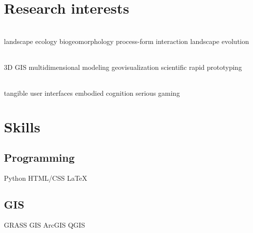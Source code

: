 \documentclass[]{baharmon-cv}
\begin{document}
{{{{{\section{Research interests}

\vspace*{0.2cm}
 \\ \vspace*{0.1cm}
\normalsize{
landscape ecology \textbullet{} biogeomorphology \textbullet{} process-form interaction \textbullet{} landscape evolution}
\\
\vspace*{0.2cm}

 \vspace{0.1em} \\ \vspace*{0.1cm}
\normalsize{
3D GIS \textbullet{} multidimensional modeling \textbullet{} geovisualization \textbullet{} scientific rapid prototyping}
\\
\vspace*{0.2cm}

 \vspace{0.1em} \\ \vspace*{0.1cm}
\normalsize{
tangible user interfaces \textbullet{} embodied cognition \textbullet{} serious gaming}
\\

\sectiondivider



\section{Skills}
\normalsize{
\begin{minipage}[t]{0.3\textwidth} 
\subsection{Programming}
\vspace*{0.1cm}
Python \textbullet{} HTML/CSS \textbullet{} \LaTeX\ \\ 
\linespread{0.1}
%
\subsection{GIS}
\vspace*{0.1cm}
GRASS GIS \textbullet{} ArcGIS \textbullet{} QGIS \\ 
\linespread{0.1}
%

\end{minipage}}}}}}}
\end{document}
